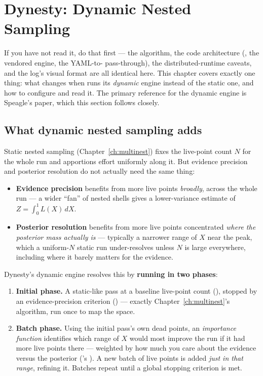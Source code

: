 \chapter{Dynesty: Dynamic Nested Sampling}
\label{ch:dynesty}

 If you have not read
it, do that first --- the algorithm, the code architecture
(, the vendored engine, the YAML-to-
pass-through), the distributed-runtime caveats, and the log's visual format are all
identical here. This chapter covers exactly one thing: what changes when
 runs its \emph{dynamic} engine instead of the
static one, and how to configure and read it. The primary reference for the dynamic
engine is Speagle's  paper\cite{Speagle:2019ivv}, which this section
follows closely.

\section{What dynamic nested sampling adds}
\label{sec:dynesty-what}

Static nested sampling (Chapter~\ref{ch:multinest}) fixes the live-point count
$N$ for the whole run and apportions effort uniformly along it. But evidence
precision and posterior resolution do not actually need the same thing:

\begin{itemize}
  \item \textbf{Evidence precision} benefits from more live points \emph{broadly},
        across the whole run --- a wider ``fan'' of nested shells gives a
        lower-variance estimate of $Z=\int_0^1 L(X)\,dX$.
  \item \textbf{Posterior resolution} benefits from more live points concentrated
        \emph{where the posterior mass actually is} --- typically a narrower range of
        $X$ near the peak, which a uniform-$N$ static run under-resolves unless $N$
        is large everywhere, including where it barely matters for the evidence.
\end{itemize}

Dynesty's dynamic engine\cite{Speagle:2019ivv} resolves this by \textbf{running in
two phases}:

\begin{enumerate}
  \item \textbf{Initial phase.} A static-like pass at a baseline live-point count
        (), stopped by an evidence-precision criterion
        () --- exactly Chapter~\ref{ch:multinest}'s algorithm,
        run once to map the space.
  \item \textbf{Batch phase.} Using the initial pass's own dead points, an
        \emph{importance function} identifies which range of $X$ would most improve
        the run if it had more live points there --- weighted by how much you care
        about the evidence versus the posterior ('s
        ). A new batch of live points is added \emph{just in that
        range}, refining it. Batches repeat until a global stopping criterion is
        met.
\end{enumerate}

